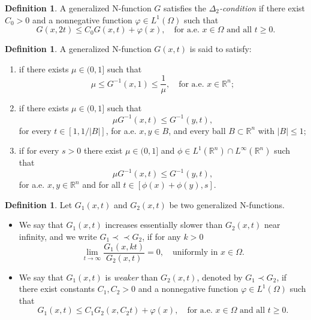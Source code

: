 \documentclass[10pt,reqno]{amsart}
\newcommand *\w{^\wedge}
\theoremstyle{definition}
\newtheorem{definition}[theorem]{Definition}
\numberwithin{equation}{section}
\begin{document}
\begin{definition}
A generalized \textnormal{N}-function $G$ satisfies the \emph{$\Delta_2$-condition} if there exist $C_0 > 0$ and a nonnegative function $\varphi \in L^1(\Omega)$ such that
\[
G(x,2t) \leq C_0 G(x,t) + \varphi(x), \quad \text{for a.e. } x\in \Omega \text{ and all } t \geq 0.
\]
\end{definition}
\begin{definition}
A generalized \textnormal{N}-function $G(x,t)$ is said to satisfy:
\begin{enumerate}
    \item[\textnormal{(A0)}] if there exists $\mu \in (0,1]$ such that
    \[
    \mu \leq G^{-1}(x,1) \leq \frac{1}{\mu}, \quad \text{for a.e. } x \in \mathbb{R}^n;
    \]
    
    \item[\textnormal{(A1)}] if there exists $\mu \in (0,1]$ such that
    \[
    \mu G^{-1}(x,t) \leq G^{-1}(y,t),
    \]
    for every $t \in [1, 1/|B|]$, for a.e. $x,y \in B$, and every ball $B \subset \mathbb{R}^n$ with $|B| \leq 1$;
    
    \item[\textnormal{(A2)}] if for every $s > 0$ there exist $\mu \in (0,1]$ and $\phi \in L^1(\mathbb{R}^n) \cap L^\infty(\mathbb{R}^n)$ such that
    \[
    \mu G^{-1}(x,t) \leq G^{-1}(y,t),
    \]
    for a.e. $x,y \in \mathbb{R}^n$ and for all $t \in [\phi(x)+\phi(y), s]$.
\end{enumerate}
\end{definition}


\begin{definition}\label{prec}
Let $G_1(x,t)$ and $G_2(x,t)$ be two generalized \textnormal{N}-functions.
\begin{itemize}
    \item[(1)] We say that $G_1(x,t)$ increases essentially slower than $G_2(x,t)$ near infinity, and we write $G_1 \prec\prec G_2$, if for any $k > 0$
    \[
    \lim_{t \to \infty} \frac{G_1(x, kt)}{G_2(x,t)} = 0, \quad \text{uniformly in } x \in \Omega.
    \]
    \item[(2)] We say that $G_1(x,t)$ is \emph{weaker} than $G_2(x,t)$, denoted by $G_1 \prec G_2$, if there exist constants $C_1, C_2 > 0$ and a nonnegative function $\varphi \in L^1(\Omega)$ such that
    \[
    G_1(x,t) \leq C_1 G_2(x, C_2 t) + \varphi(x), \quad \text{for a.e. } x \in \Omega \text{ and all } t \geq 0.
    \]
\end{itemize}
\end{definition}
\end{document}
